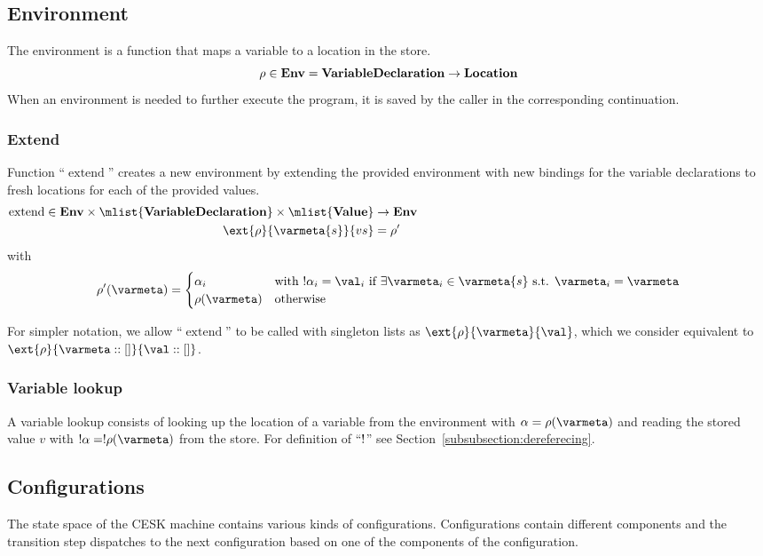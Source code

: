 \documentclass{article}
\DeclareMathOperator{\extend}{extend}
\begin{document}
\subsection{Environment}
\label{subsec:env-definition}
The environment is a function that maps a variable to a location in the store.
\[\rho \in \mathbf{Env} = \mathbf{VariableDeclaration} \rightarrow \mathbf{Location}\]
When an environment is needed to further execute the program, it is saved by the caller in the corresponding continuation.

\subsubsection{Extend}
\label{subsubsec:extend-env}

Function ``$\extend$'' creates a new environment by extending the provided environment with new bindings for the variable declarations to fresh locations for each of the provided values.
\begin{align*}
  \extend \in \denv \times \mlist{\dvardecl} \times \mlist{\dval} &\rightarrow  \denv \hspace{100mm} \\
  \ext{\env}{\varmeta{s}}{\vals} &= \env'
\end{align*}
with
\[
	\env'(\varmeta) =\begin{cases}
	\loc_i & \textrm{with }\deref{\loc_i} = \val_i\textrm{ if }\exists\varmeta_i \in \varmeta{s} \textrm{ s.t. } \varmeta_i = \varmeta\\
	\env(\varmeta) &\textrm{otherwise}
	\end{cases}
\]

For simpler notation, we allow ``$\extend$'' to be called with singleton lists as $\ext{\env}{\varmeta}{\val}$, which we consider equivalent to $\ext{\env}{\varmeta :: []}{\val :: []}$.
\subsubsection{Variable lookup}
\label{subsubsec:variable-lookup}
A variable lookup consists of looking up the location of a variable from the environment with $\loc = \env(\varmeta)$ and reading the stored value $v$ with $\deref{\loc} = \deref{\env(\varmeta)}$ from the store.
For definition of ``$\deref$'' see Section~\ref{subsubsection:dereferecing}.

\subsection{Configurations}
\label{subsec:cesk-configs}
The state space of the CESK machine contains various kinds of configurations.
Configurations contain different components and the transition step dispatches to the next configuration based on one of the components of the configuration.
\end{document}
